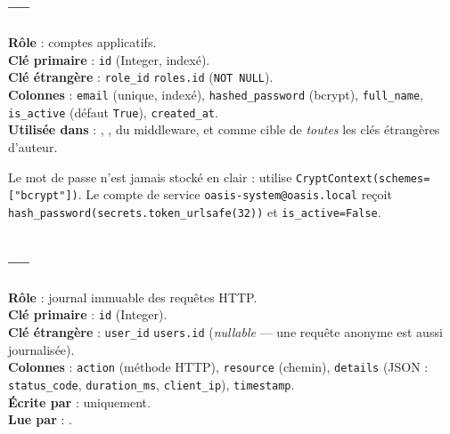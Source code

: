 \subsection{ --- }

\textbf{Rôle} : comptes applicatifs.\\
\textbf{Clé primaire} : \texttt{id} (Integer, indexé).\\
\textbf{Clé étrangère} : \texttt{role\_id} \arrowto{} \texttt{roles.id}
(\texttt{NOT NULL}).\\
\textbf{Colonnes} : \texttt{email} (unique, indexé), \texttt{hashed\_password}
(bcrypt), \texttt{full\_name}, \texttt{is\_active} (défaut \texttt{True}),
\texttt{created\_at}.\\
\textbf{Utilisée dans} : , ,
 du middleware, et comme cible de \emph{toutes} les clés
étrangères d'auteur.

\begin{infobox}
Le mot de passe n'est jamais stocké en clair :  utilise
\texttt{CryptContext(schemes=["bcrypt"])}. Le compte de service
\texttt{oasis-system@oasis.local} reçoit
\texttt{hash\_password(secrets.token\_urlsafe(32))} et
\texttt{is\_active=False}.
\end{infobox}

\subsection{ --- }

\textbf{Rôle} : journal immuable des requêtes HTTP.\\
\textbf{Clé primaire} : \texttt{id} (Integer).\\
\textbf{Clé étrangère} : \texttt{user\_id} \arrowto{} \texttt{users.id}
(\emph{nullable} --- une requête anonyme est aussi journalisée).\\
\textbf{Colonnes} : \texttt{action} (méthode HTTP), \texttt{resource} (chemin),
\texttt{details} (JSON : \texttt{status\_code}, \texttt{duration\_ms},
\texttt{client\_ip}), \texttt{timestamp}.\\
\textbf{Écrite par} :  uniquement.\\
\textbf{Lue par} :  \arrowto{}
.

